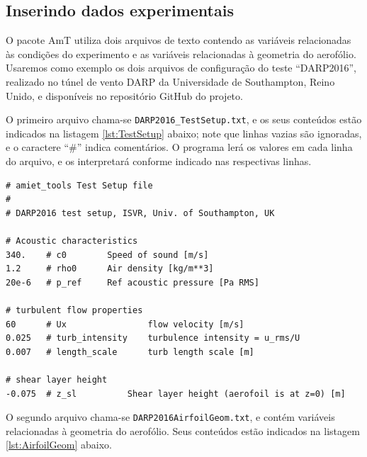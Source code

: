\documentclass[a4paper, 11pt, twoside]{article}
\begin{document}

\subsection{Inserindo dados experimentais}

O pacote AmT utiliza dois arquivos de texto contendo as variáveis relacionadas às condições do experimento e as variáveis relacionadas à geometria do aerofólio. Usaremos como exemplo os dois arquivos de configuração do teste ``DARP2016'', realizado no túnel de vento DARP da Universidade de Southampton, Reino Unido, e disponíveis no repositório GitHub do projeto.

O primeiro arquivo chama-se \verb|DARP2016_TestSetup.txt|, e os seus conteúdos estão indicados na listagem \ref{lst:TestSetup} abaixo; note que linhas vazias são ignoradas, e o caractere ``\#'' indica comentários. O programa lerá os valores em cada linha do arquivo, e os interpretará conforme indicado nas respectivas linhas.

\begin{lstlisting}[caption={Arquivo \texttt{DARP2016\_TestSetup.txt}}, label={lst:TestSetup}]
# amiet_tools Test Setup file
#
# DARP2016 test setup, ISVR, Univ. of Southampton, UK

# Acoustic characteristics
340.	# c0		Speed of sound [m/s]
1.2		# rho0		Air density [kg/m**3]
20e-6	# p_ref		Ref acoustic pressure [Pa RMS]

# turbulent flow properties
60		# Ux				flow velocity [m/s]
0.025	# turb_intensity	turbulence intensity = u_rms/U
0.007	# length_scale		turb length scale [m]

# shear layer height
-0.075	# z_sl			Shear layer height (aerofoil is at z=0) [m]
\end{lstlisting}

O segundo arquivo chama-se \verb|DARP2016AirfoilGeom.txt|, e contém variáveis relacionadas à geometria do aerofólio. Seus conteúdos estão indicados na listagem \ref{lst:AirfoilGeom} abaixo.
\end{document}
